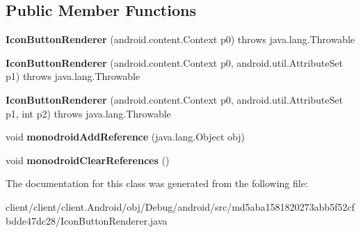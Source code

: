 \subsection*{Public Member Functions}
\begin{DoxyCompactItemize}
\item 
\hypertarget{classmd5aba1581820273abb5f52cfbdde47dc28_1_1IconButtonRenderer_aa2daec66e5d358343b0b3ff8c4bbdbc1}{}{\bfseries Icon\+Button\+Renderer} (android.\+content.\+Context p0)  throws java.\+lang.\+Throwable 	\label{classmd5aba1581820273abb5f52cfbdde47dc28_1_1IconButtonRenderer_aa2daec66e5d358343b0b3ff8c4bbdbc1}

\item 
\hypertarget{classmd5aba1581820273abb5f52cfbdde47dc28_1_1IconButtonRenderer_ad5104bd6151269c6217fe4073838f720}{}{\bfseries Icon\+Button\+Renderer} (android.\+content.\+Context p0, android.\+util.\+Attribute\+Set p1)  throws java.\+lang.\+Throwable 	\label{classmd5aba1581820273abb5f52cfbdde47dc28_1_1IconButtonRenderer_ad5104bd6151269c6217fe4073838f720}

\item 
\hypertarget{classmd5aba1581820273abb5f52cfbdde47dc28_1_1IconButtonRenderer_a518d08260379d3a4019a68c119dc7ce5}{}{\bfseries Icon\+Button\+Renderer} (android.\+content.\+Context p0, android.\+util.\+Attribute\+Set p1, int p2)  throws java.\+lang.\+Throwable 	\label{classmd5aba1581820273abb5f52cfbdde47dc28_1_1IconButtonRenderer_a518d08260379d3a4019a68c119dc7ce5}

\item 
\hypertarget{classmd5aba1581820273abb5f52cfbdde47dc28_1_1IconButtonRenderer_ab22ab5d7faf06e15eaca911217fe787f}{}void {\bfseries monodroid\+Add\+Reference} (java.\+lang.\+Object obj)\label{classmd5aba1581820273abb5f52cfbdde47dc28_1_1IconButtonRenderer_ab22ab5d7faf06e15eaca911217fe787f}

\item 
\hypertarget{classmd5aba1581820273abb5f52cfbdde47dc28_1_1IconButtonRenderer_a56a50d4c550e2cb8cd9c9b60c42725c8}{}void {\bfseries monodroid\+Clear\+References} ()\label{classmd5aba1581820273abb5f52cfbdde47dc28_1_1IconButtonRenderer_a56a50d4c550e2cb8cd9c9b60c42725c8}

\end{DoxyCompactItemize}


The documentation for this class was generated from the following file\+:\begin{DoxyCompactItemize}
\item 
client/client/client.\+Android/obj/\+Debug/android/src/md5aba1581820273abb5f52cfbdde47dc28/Icon\+Button\+Renderer.\+java\end{DoxyCompactItemize}
